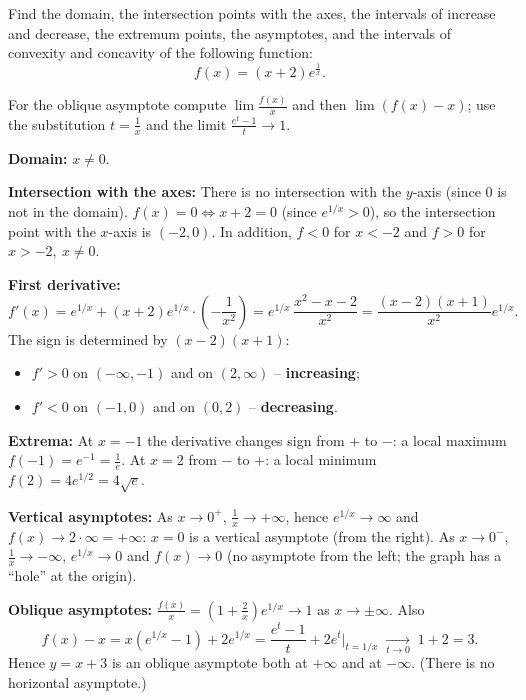
\begin{question}
Find the domain, the intersection points with the axes, the intervals of increase and decrease, the extremum points, the asymptotes, and the intervals of convexity and concavity of the following function:
\[ f(x)=(x+2)e^{\frac1x}. \]
\end{question}

\begin{hint}
For the oblique asymptote compute $\lim\frac{f(x)}{x}$ and then $\lim (f(x)-x)$; use the substitution $t=\frac1x$ and the limit $\frac{e^t-1}{t}\to1$.
\end{hint}

\begin{solution}
\textbf{Domain:} $x\neq0$.

\textbf{Intersection with the axes:} There is no intersection with the $y$-axis (since $0$ is not in the domain). $f(x)=0\iff x+2=0$ (since $e^{1/x}>0$), so the intersection point with the $x$-axis is $(-2,0)$. In addition, $f<0$ for $x<-2$ and $f>0$ for $x>-2,\ x\ne0$.

\textbf{First derivative:}
\[ f'(x)=e^{1/x}+(x+2)e^{1/x}\cdot\left(-\frac1{x^2}\right)=e^{1/x}\,\frac{x^2-x-2}{x^2}=\frac{(x-2)(x+1)}{x^2}e^{1/x}. \]
The sign is determined by $(x-2)(x+1)$:
\begin{itemize}
  \item $f'>0$ on $(-\infty,-1)$ and on $(2,\infty)$ -- \textbf{increasing};
  \item $f'<0$ on $(-1,0)$ and on $(0,2)$ -- \textbf{decreasing}.
\end{itemize}
\textbf{Extrema:} At $x=-1$ the derivative changes sign from $+$ to $-$: a local maximum $f(-1)=e^{-1}=\frac1e$. At $x=2$ from $-$ to $+$: a local minimum $f(2)=4e^{1/2}=4\sqrt e$.

\textbf{Vertical asymptotes:} As $x\to0^+$, $\frac1x\to+\infty$, hence $e^{1/x}\to\infty$ and $f(x)\to 2\cdot\infty=+\infty$: $x=0$ is a vertical asymptote (from the right). As $x\to0^-$, $\frac1x\to-\infty$, $e^{1/x}\to0$ and $f(x)\to 0$ (no asymptote from the left; the graph has a ``hole'' at the origin).

\textbf{Oblique asymptotes:} $\frac{f(x)}{x}=\left(1+\frac2x\right)e^{1/x}\to1$ as $x\to\pm\infty$. Also
\[ f(x)-x=x\left(e^{1/x}-1\right)+2e^{1/x}=\frac{e^{t}-1}{t}+2e^{t}\Big|_{t=1/x}\;\xrightarrow[t\to0]{}\;1+2=3. \]
Hence $y=x+3$ is an oblique asymptote both at $+\infty$ and at $-\infty$. (There is no horizontal asymptote.)


\end{solution}
